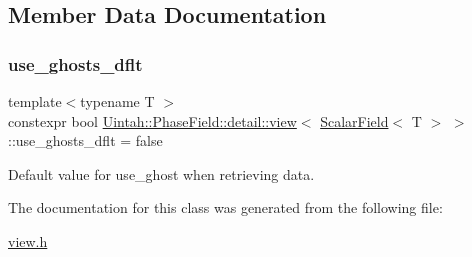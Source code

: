\subsection{Member Data Documentation}
\mbox{\label{classUintah_1_1PhaseField_1_1detail_1_1view_3_01ScalarField_3_01T_01_4_01_4_aab1ca433909d91301560b00feb645d8b}} 
\subsubsection{\texorpdfstring{use\+\_\+ghosts\+\_\+dflt}{use\_ghosts\_dflt}}
{\footnotesize\ttfamily template$<$typename T $>$ \\
constexpr bool \hyperlink{classUintah_1_1PhaseField_1_1detail_1_1view}{Uintah\+::\+Phase\+Field\+::detail\+::view}$<$ \hyperlink{structUintah_1_1PhaseField_1_1ScalarField}{Scalar\+Field}$<$ T $>$ $>$\+::use\+\_\+ghosts\+\_\+dflt = false\hspace{0.3cm}{\ttfamily [static]}}



Default value for use\+\_\+ghost when retrieving data. 



The documentation for this class was generated from the following file\+:\begin{DoxyCompactItemize}
\item 
\hyperlink{view_8h}{view.\+h}\end{DoxyCompactItemize}
